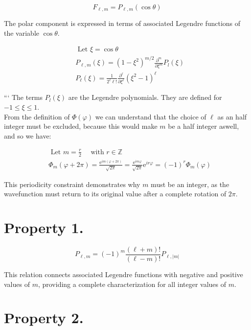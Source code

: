 \documentclass[italian]{HKNdocument}
\begin{document}
\begin{equation*}
F_{\ell, m}=P_{\ell, m}(\cos \theta) \tag{8.44}
\end{equation*}

The polar component is expressed in terms of associated Legendre functions of the variable $\cos\theta$.

\begin{align*}
& \text { Let } \xi=\cos \theta \\
& P_{\ell, m}(\xi)=\left(1-\xi^{2}\right)^{m / 2} \frac{\partial^{m}}{\partial \xi^{m}} P_{l}(\xi)  \tag{8.45}\\
& P_{\ell}(\xi)=\frac{1}{2^{\ell} \ell!} \frac{\partial^{\ell}}{\partial \xi^{\ell}}\left(\xi^{2}-1\right)^{\ell}
\end{align*}

```
The terms $P_{l}(\xi)$ are the Legendre polynomials. They are defined for $-1 \leq \xi \leq 1$.\\
From the definition of $\Phi(\varphi)$ we can understand that the choice of $\ell$ as an half integer must be excluded, because this would make $m$ be a half integer aswell, and so we have:

\begin{align*}
& \text { Let } m=\frac{r}{2} \quad \text { with } r \in \mathbb{Z} \\
& \Phi_{m}(\varphi+2 \pi)=\frac{\mathrm{e}^{i m(\varphi+2 \pi)}}{\sqrt{2 \pi}}=\frac{\mathrm{e}^{i m \varphi}}{\sqrt{2 \pi}} \mathrm{e}^{i r \varphi}=(-1)^{r} \Phi_{m}(\varphi) \tag{8.46}
\end{align*}

This periodicity constraint demonstrates why $m$ must be an integer, as the wavefunction must return to its original value after a complete rotation of $2\pi$.

\section*{Property 1.}

\begin{equation*}
P_{\ell, m}=(-1)^{m} \frac{(\ell+m)!}{(\ell-m)!} P_{\ell,|m|} \tag{8.47}
\end{equation*}

This relation connects associated Legendre functions with negative and positive values of $m$, providing a complete characterization for all integer values of $m$.

\section*{Property 2.}
\end{document}
